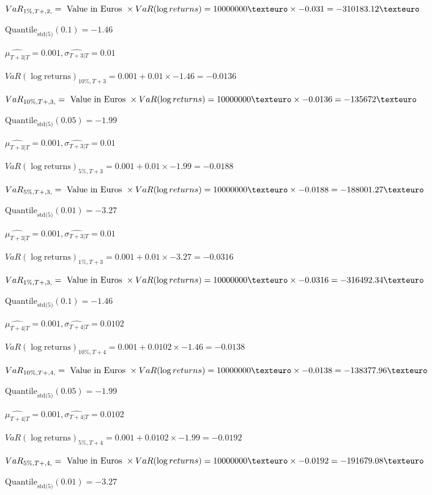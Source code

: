 $VaR_{1\%, T + ,2,} = \text{ Value in Euros } \times VaR(\log returns) = 10 000 000 \texteuro \times-0.031 = -310183.12 \texteuro$


$\text{Quantile}_\text{std(5)}(0.1) = -1.46$

$\hat{\mu_{T+3|T}} = 0.001, \hat{\sigma_{T+3|T}} = 0.01$

$VaR(\log \text{returns})_{10\%, T + 3} = 0.001 + 0.01\times-1.46 = -0.0136$

$VaR_{10\%, T + ,3,} = \text{ Value in Euros } \times VaR(\log returns) = 10 000 000 \texteuro \times-0.0136 = -135672 \texteuro$


$\text{Quantile}_\text{std(5)}(0.05) = -1.99$

$\hat{\mu_{T+3|T}} = 0.001, \hat{\sigma_{T+3|T}} = 0.01$

$VaR(\log \text{returns})_{5\%, T + 3} = 0.001 + 0.01\times-1.99 = -0.0188$

$VaR_{5\%, T + ,3,} = \text{ Value in Euros } \times VaR(\log returns) = 10 000 000 \texteuro \times-0.0188 = -188001.27 \texteuro$


$\text{Quantile}_\text{std(5)}(0.01) = -3.27$

$\hat{\mu_{T+3|T}} = 0.001, \hat{\sigma_{T+3|T}} = 0.01$

$VaR(\log \text{returns})_{1\%, T + 3} = 0.001 + 0.01\times-3.27 = -0.0316$

$VaR_{1\%, T + ,3,} = \text{ Value in Euros } \times VaR(\log returns) = 10 000 000 \texteuro \times-0.0316 = -316492.34 \texteuro$


$\text{Quantile}_\text{std(5)}(0.1) = -1.46$

$\hat{\mu_{T+4|T}} = 0.001, \hat{\sigma_{T+4|T}} = 0.0102$

$VaR(\log \text{returns})_{10\%, T + 4} = 0.001 + 0.0102\times-1.46 = -0.0138$

$VaR_{10\%, T + ,4,} = \text{ Value in Euros } \times VaR(\log returns) = 10 000 000 \texteuro \times-0.0138 = -138377.96 \texteuro$


$\text{Quantile}_\text{std(5)}(0.05) = -1.99$

$\hat{\mu_{T+4|T}} = 0.001, \hat{\sigma_{T+4|T}} = 0.0102$

$VaR(\log \text{returns})_{5\%, T + 4} = 0.001 + 0.0102\times-1.99 = -0.0192$

$VaR_{5\%, T + ,4,} = \text{ Value in Euros } \times VaR(\log returns) = 10 000 000 \texteuro \times-0.0192 = -191679.08 \texteuro$


$\text{Quantile}_\text{std(5)}(0.01) = -3.27$

